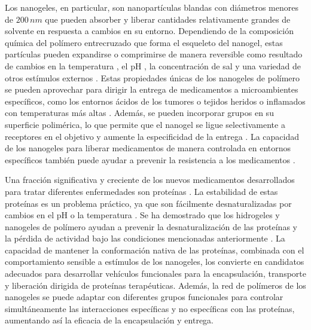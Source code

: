 Los nanogeles, en particular, son nanopart\'iculas blandas con di\'ametros menores de $200\,nm$  que pueden absorber y liberar cantidades relativamente grandes de solvente en respuesta a cambios en su entorno.
Dependiendo de la composici\'on qu\'imica del pol\'imero entrecruzado que forma el esqueleto del nanogel, estas part\'iculas pueden expandirse o comprimirse de manera reversible como resultado de cambios en la temperatura \cite{agnihotri2021temperature}, el pH \cite{sharma2022modulating}, la concentraci\'on de sal \cite{saraydin2022calculations} y una variedad de otros est\'imulos externos \cite{jung2020responsive,plamper2017functional, yang2022co}.
Estas propiedades \'unicas de los nanogeles de pol\'imero se pueden aprovechar para dirigir la entrega de medicamentos a microambientes espec\'ificos, como los entornos \'acidos de los tumores \cite{zhang2020construction} o tejidos heridos o inflamados con temperaturas m\'as altas \cite{wu2010core}.
Adem\'as, se pueden incorporar grupos en su superficie polim\'erica, lo que permite que el nanogel se ligue selectivamente a receptores en el objetivo y aumente la especificidad de la entrega \cite{ahadian2020micro, mukherjee2019lipid, torchilin2007micellar, farokhzad2006targeted}.
La capacidad de los nanogeles para liberar medicamentos de manera controlada en entornos espec\'ificos tambi\'en puede ayudar a prevenir la  resistencia a los medicamentos \cite{mukherjee2019lipid}.


Una fracci\'on significativa y creciente de los nuevos medicamentos desarrollados para tratar diferentes enfermedades son prote\'inas \cite{mahmood2023recent}.
La estabilidad de estas prote\'inas es un problema pr\'actico, ya que son f\'acilmente desnaturalizadas por cambios en el pH o la temperatura \cite{frokjaer2005protein}.
Se ha demostrado que los hidrogeles y nanogeles de pol\'imero ayudan a prevenir la desnaturalizaci\'on de las prote\'inas y la p\'erdida de actividad bajo las condiciones mencionadas anteriormente \cite{macdougall2021charged, peppas2004hydrogels}.
La capacidad de mantener la conformaci\'on nativa de las prote\'inas, combinada con el comportamiento sensible a est\'imulos de los nanogeles, los convierte en candidatos adecuados para desarrollar veh\'iculos funcionales para la encapsulaci\'on, transporte y liberaci\'on dirigida de prote\'inas terap\'euticas.
Adem\'as, la red de pol\'imeros de los nanogeles se puede adaptar con diferentes grupos funcionales para controlar simult\'aneamente las interacciones espec\'ificas y no espec\'ificas con las prote\'inas, aumentando as\'i la eficacia de la encapsulaci\'on y entrega.


